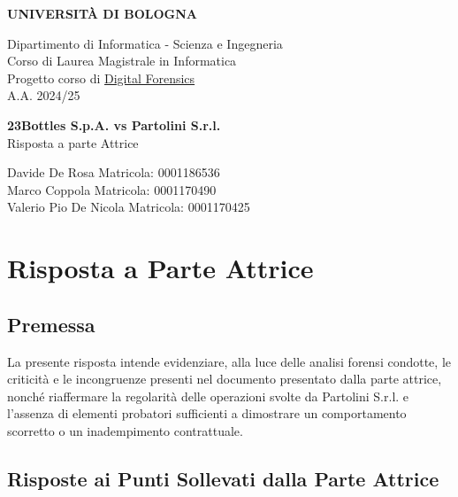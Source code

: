 \documentclass[a4paper,12pt]{report}
\begin{document}
\begin{titlepage}
    \centering
    \vspace*{0.1cm}

    \Huge
    \textbf{UNIVERSITÀ DI BOLOGNA}

    \vspace{1cm}
    \Large
    Dipartimento di Informatica - Scienza e Ingegneria \\
    Corso di Laurea Magistrale in Informatica \\\vspace{1cm}
    Progetto corso di \href{https://www.unibo.it/it/studiare/dottorati-master-specializzazioni-e-altra-formazione/insegnamenti/insegnamento/2024/479039}{Digital Forensics} \\
    A.A. 2024/25

    \vspace{5.5cm}
    \textbf{\LARGE 23Bottles S.p.A. vs Partolini S.r.l.}\\\vspace{0.3cm}
    \Large Risposta a parte Attrice

    \vfill

    \vfill

    \large
    Davide De Rosa \hfill Matricola: 0001186536\\
    Marco Coppola \hfill Matricola: 0001170490\\
    Valerio Pio De Nicola \hfill Matricola: 0001170425\\
\end{titlepage}

\tableofcontents
\newpage

\chapter{Risposta a Parte Attrice}
\section{Premessa}
La presente risposta intende evidenziare, alla luce delle analisi forensi condotte, le criticità e le incongruenze presenti nel documento presentato dalla parte attrice, nonché riaffermare la regolarità delle operazioni svolte da Partolini S.r.l. e l'assenza di elementi probatori sufficienti a dimostrare un comportamento scorretto o un inadempimento contrattuale.

\section{Risposte ai Punti Sollevati dalla Parte Attrice}
\end{document}
